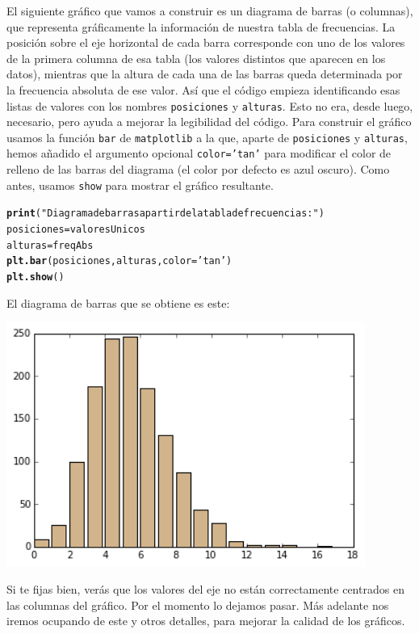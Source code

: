 \documentclass[10pt,a4paper]{article}\usepackage[]{graphicx}\usepackage[]{color}
\makeatletter
\newcommand{\hlstr}[1]{\textcolor[rgb]{0.192,0.494,0.8}{#1}}%
\newcommand{\hlstd}[1]{\textcolor[rgb]{0.345,0.345,0.345}{#1}}%
\newcommand{\hlkwb}[1]{\textcolor[rgb]{0.69,0.353,0.396}{#1}}%
\newcommand{\hlkwc}[1]{\textcolor[rgb]{0.333,0.667,0.333}{#1}}%
\newcommand{\hlkwd}[1]{\textcolor[rgb]{0.737,0.353,0.396}{\textbf{#1}}}%
\newenvironment{kframe}{%
 \def\at@end@of@kframe{}%
 \ifinner\ifhmode%
  \def\at@end@of@kframe{\end{minipage}}%
  \begin{minipage}{\columnwidth}%
 \fi\fi%
 \def\FrameCommand##1{\hskip\@totalleftmargin \hskip-\fboxsep
 \colorbox{shadecolor}{##1}\hskip-\fboxsep
     \hskip-\linewidth \hskip-\@totalleftmargin \hskip\columnwidth}%
 \MakeFramed {\advance\hsize-\width
   \@totalleftmargin\z@ \linewidth\hsize
   \@setminipage}}%
 {\par\unskip\endMakeFramed%
 \at@end@of@kframe}
\newenvironment{knitrout}{}{} %
\makeatother
\begin{document}
El siguiente gráfico que vamos a construir es un diagrama de barras (o columnas), que representa gráficamente la información de nuestra tabla de frecuencias. La posición sobre el eje horizontal de cada barra corresponde con uno de los valores de la primera columna de esa tabla (los valores distintos que aparecen en los datos), mientras que la altura de cada una de las barras queda determinada por la frecuencia absoluta de ese valor. Así que el código empieza identificando esas listas de valores con los nombres {\tt posiciones} y {\tt alturas}. Esto no era, desde luego, necesario, pero ayuda a mejorar la legibilidad del código. Para construir el gráfico usamos la función {\tt bar} de {\tt matplotlib} a la que, aparte de {\tt posiciones} y {\tt alturas}, hemos añadido el argumento opcional {\tt color='tan'} para modificar el color de relleno de las barras del diagrama (el color por defecto es azul oscuro). Como antes, usamos {\tt show} para mostrar el gráfico resultante.
\begin{knitrout}
\color{fgcolor}\begin{kframe}
\begin{alltt}
\hlkwd{print}\hlstd{(}\hlstr{"Diagrama de barras a partir de la tabla de frecuencias:"}\hlstd{)}
\hlstd{posiciones} \hlkwb{=} \hlstd{valoresUnicos}
\hlstd{alturas} \hlkwb{=} \hlstd{freqAbs}
\hlkwd{plt.bar}\hlstd{(posiciones, alturas,} \hlkwc{color}\hlstd{=}\hlstr{'tan'}\hlstd{)}
\hlkwd{plt.show}\hlstd{()}
\end{alltt}
\end{kframe}
\end{knitrout}
El diagrama de barras que se obtiene es este:
\begin{center}
\includegraphics[height=8cm]{../fig/Tut-02-py-04-diagBarras.png}
\end{center}
Si te fijas bien, verás que los valores del eje no están correctamente centrados en las columnas del gráfico. Por el momento lo dejamos pasar. Más adelante nos iremos ocupando de este y otros detalles, para mejorar la calidad de los gráficos.
\end{document}
